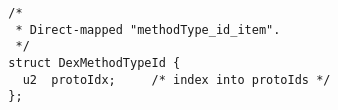 {\scriptsize \begin{verbatim}
  /*
   * Direct-mapped "methodType_id_item".
   */
  struct DexMethodTypeId {
    u2  protoIdx;     /* index into protoIds */
  };
\end{verbatim} }
